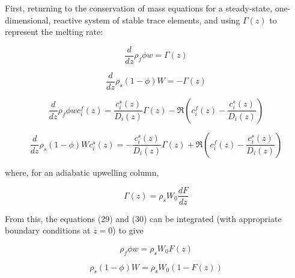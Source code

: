 \documentclass[draft]{agujournal2019}
\begin{document}
First, returning to the conservation of mass equations for a steady-state, one-dimensional, reactive system of stable trace elements, and using $\Gamma(z)$ to represent the melting rate:

\begin{linenomath*}
\begin{equation}
    \frac{d}{dz} \rho_f \phi w = \Gamma(z)\label{eq:29}
\end{equation}
\end{linenomath*}

\begin{linenomath*}
\begin{equation}
    \frac{d}{dz} \rho_s (1-\phi) W = -\Gamma(z)\label{eq:30}
\end{equation}
\end{linenomath*}

\begin{linenomath*}
\begin{equation}
    \frac{d}{dz} \rho_f \phi w c_i^f(z) = \frac{c_i^s(z)}{D_i(z)}\Gamma(z) - \Re\left(c_i^f(z) - \frac{c_i^s(z)}{D_i(z)}\right)\label{eq:31}
\end{equation}
\end{linenomath*}

\begin{linenomath*}
\begin{equation}
    \frac{d}{dz} \rho_s (1-\phi) W c_i^s(z) = -\frac{c_i^s(z)}{D_i(z)}\Gamma(z) + \Re\left(c_i^f(z) - \frac{c_i^s(z)}{D_i(z)}\right)\label{eq:32}
\end{equation}
\end{linenomath*}

where, for an adiabatic upwelling column,

\begin{linenomath*}
\begin{equation}
    \Gamma(z) = \rho_s W_0 \frac{dF}{dz}\label{eq:33}
\end{equation}
\end{linenomath*}

From this, the equations (29) and (30) can be integrated (with appropriate boundary conditions at $z=0$) to give

\begin{linenomath*}
\begin{equation}
    \rho_f \phi w = \rho_s W_0 F(z)\label{eq:34}
\end{equation}
\end{linenomath*}

\begin{linenomath*}
\begin{equation}
    \rho_s (1-\phi) W = \rho_s W_0 (1 - F(z))\label{eq:35}
\end{equation}
\end{linenomath*}
\end{document}
